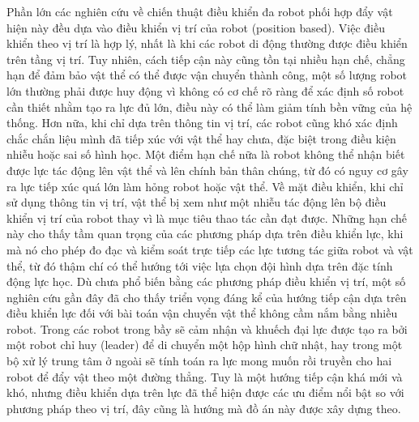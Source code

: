 Phần lớn các nghiên cứu về chiến thuật điều khiển đa robot phối hợp đẩy vật hiện này đều dựa vào điều khiển vị trí của robot (position based). Việc điều khiển theo vị trí là hợp lý, nhất là khi các robot di động thường được điều khiển trên tầng vị trí. Tuy nhiên, cách tiếp cận này cũng tồn tại nhiều hạn chế, chẳng hạn để đảm bảo vật thể có thể được vận chuyển thành công, một số lượng robot lớn thường phải được huy động vì không có cơ chế rõ ràng để xác định số robot cần thiết nhằm tạo ra lực đủ lớn, điều này có thể làm giảm tính bền vững của hệ thống. Hơn nữa, khi chỉ dựa trên thông tin vị trí, các robot cũng khó xác định chắc chắn liệu mình đã tiếp xúc với vật thể hay chưa, đặc biệt trong điều kiện nhiễu hoặc sai số hình học. Một điểm hạn chế nữa là robot không thể nhận biết được lực tác động lên vật thể và lên chính bản thân chúng, từ đó có nguy cơ gây ra lực tiếp xúc quá lớn làm hỏng robot hoặc vật thể. Về mặt điều khiển, khi chỉ sử dụng thông tin vị trí, vật thể bị xem như một nhiễu tác động lên bộ điều khiển vị trí của robot thay vì là mục tiêu thao tác cần đạt được. Những hạn chế này cho thấy tầm quan trọng của các phương pháp dựa trên điều khiển lực, khi mà nó cho phép đo đạc và kiểm soát trực tiếp các lực tương tác giữa robot và vật thể, từ đó thậm chí có thể hướng tới việc lựa chọn đội hình dựa trên đặc tính động lực học. Dù chưa phổ biến bằng các phương pháp điều khiển vị trí, một số nghiên cứu gần đây đã cho thấy triển vọng đáng kể của hướng tiếp cận dựa trên điều khiển lực đối với bài toán vận chuyển vật thể không cầm nắm bằng nhiều robot. Trong \cite{wang2016kinematic,wang2015multi} các robot trong bầy sẽ cảm nhận và khuếch đại lực được tạo ra bởi một robot chỉ huy (leader) để di chuyển một hộp hình chữ nhật, hay trong \cite{neumann2014object,neumann2016hybrid} một bộ xử lý trung tâm ở ngoài sẽ tính toán ra lực mong muốn rồi truyền cho hai robot để đẩy vật theo một đường thẳng. Tuy là một hướng tiếp cận khá mới và khó, nhưng điều khiển dựa trên lực đã thể hiện được các ưu điểm nổi bật so với phương pháp theo vị trí, đây cũng là hướng mà đồ án này được xây dựng theo.

